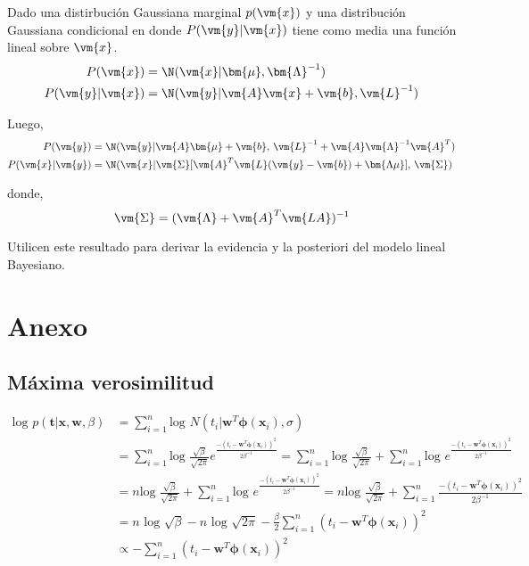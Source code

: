 \documentclass[a4paper,10pt]{article}
\begin{document}
\begin{framed}
Dado una distirbuci\'on Gaussiana marginal $p(\vm{x})$ y una distribuci\'on Gaussiana condicional en donde $P(\vm{y}|\vm{x})$ tiene como media una funci\'on lineal sobre $\vm{x}$.
\begin{align}
    P(\vm{x}) &=  \N(\vm{x}|\bm{\mu},\bm{\Lambda}^{-1}) \\
   P(\vm{y}|\vm{x}) &=  \N(\vm{y}|\vm{A}\vm{x}+\vm{b},\vm{L}^{-1})    
\end{align}


 Luego,  
\begin{align}
    P(\vm{y}) &=  \N(\vm{y}|\vm{A}\bm{\mu}+\vm{b},\, \vm{L}^{-1} + \vm{A}\vm{\Lambda}^{-1}\vm{A}^T) \\
   P(\vm{x}|\vm{y}) &=  \N(\vm{x}|\vm{\Sigma}[\vm{A}^T \vm{L}(\vm{y}-\vm{b})+ \bm{\Lambda\mu}],\,  \vm{\Sigma})\label{eq:post}
\end{align}

donde, 
\begin{equation}
 \vm{\Sigma} = (\vm{\Lambda} + \vm{A}^T \vm{LA} )^{-1}
\end{equation}
\end{framed}


\vspace{0.3cm}

Utilicen este resultado para derivar la evidencia y la posteriori del modelo lineal Bayesiano.

\newpage


\section{Anexo}

\subsection{M\'axima verosimilitud}

\begin{equation}\label{eq:maximum_likelihood}
 \begin{split}
   \text{log } p(\bm{t} | \bm{x}, \bm{w}, \beta) & = \sum_{i=1}^{n} \text{log } N(t_i | \bm{w}^T \bm{\phi}(\bm{x}_i), \sigma)  \\
  & =  \sum_{i=1}^{n} \text{log }  \frac{\sqrt{\beta} }{\sqrt{2\pi}} e^{\frac{-(t_i - \bm{w}^T\bm{\phi}(\bm{x}_i))^2}{2\beta^{-1}} } = \sum_{i=1}^{n} \text{log } \frac{\sqrt{\beta} }{\sqrt{2\pi}} + \sum_{i=1}^{n} \text{log } e^{\frac{-(t_i - \bm{w}^T\bm{\phi}(\bm{x}_i))^2}{2\beta^{-1}} } \\
  & = n \text{log } \frac{\sqrt{\beta} }{\sqrt{2\pi}} + \sum_{i=1}^{n} \text{log } e^{\frac{-(t_i - \bm{w}^T\bm{\phi}(\bm{x}_i))^2}{2\beta^{-1}} } = n \text{log } \frac{\sqrt{\beta} }{\sqrt{2\pi}} + \sum_{i=1}^{n}  \frac{-(t_i - \bm{w}^T\bm{\phi}(\bm{x}_i))^2}{2\beta^{-1}} \\
   &  = n \text{ log } \sqrt{\beta} - n \text{ log } \sqrt{2\pi} - \frac{\beta}{2} \sum_{i=1}^{n}  (t_i - \bm{w}^T\bm{\phi}(\bm{x}_i))^2   \\
  & \propto  - \sum_{i=1}^{n}  (t_i - \bm{w}^T\bm{\phi}(\bm{x}_i))^2 
 \end{split}
\end{equation}
\end{document}
